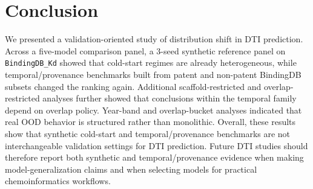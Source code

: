 \section{Conclusion}

We presented a validation-oriented study of distribution shift in DTI prediction. Across a five-model comparison panel, a 3-seed synthetic reference panel on \texttt{BindingDB\_Kd} showed that cold-start regimes are already heterogeneous, while temporal/provenance benchmarks built from patent and non-patent BindingDB subsets changed the ranking again. Additional scaffold-restricted and overlap-restricted analyses further showed that conclusions within the temporal family depend on overlap policy. Year-band and overlap-bucket analyses indicated that real OOD behavior is structured rather than monolithic. Overall, these results show that synthetic cold-start and temporal/provenance benchmarks are not interchangeable validation settings for DTI prediction. Future DTI studies should therefore report both synthetic and temporal/provenance evidence when making model-generalization claims and when selecting models for practical chemoinformatics workflows.

